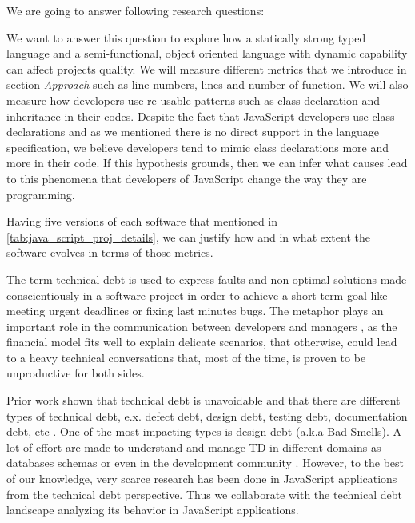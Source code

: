 
We are going to answer following research questions:

\noindent{\rqi}

We want to answer this question to explore how a statically strong typed language and a semi-functional, object oriented language with dynamic capability can affect projects quality. We will measure different metrics that we introduce in section \textit{Approach} such as line numbers, lines and number of function. We will also measure how developers use re-usable patterns such as class declaration and inheritance in their codes. Despite the fact that JavaScript developers use class declarations and as we mentioned there is no direct support in the language specification, we believe developers tend to mimic class declarations more and more in their code. If this hypothesis grounds, then we can infer what causes lead to this phenomena that developers of JavaScript change the way they are programming.
\par
{}
Having five versions of each software that mentioned in \ref{tab:java_script_proj_details}, we can justify how and in what extent the software evolves in terms of those metrics. 

\noindent{\rqii}

		 
The term technical debt is used to express faults and non-optimal solutions made conscientiously in a software project in order to achieve a short-term goal like meeting urgent deadlines or fixing last minutes bugs. The metaphor plays an important role in the communication between developers and managers \cite{kruchten2013MTD}, as the financial model fits well to explain delicate scenarios, that otherwise, could lead to a heavy technical conversations that, most of the time, is proven to be unproductive for both sides.  
		 
Prior work shown that technical debt is unavoidable \cite{zazworka2013MTD} and that there are different types of technical debt, e.x. defect debt, design debt, testing debt, documentation debt, etc \cite{Seaman2011MMTD} . One of the most impacting types is design debt \cite{zazworka2011MTD}\cite{Fontana2012MTD} (a.k.a Bad Smells). A lot of effort are made to understand and manage TD in different domains as databases schemas \cite{Weber2014MTD} or even in the development community \cite{Tamburri2013CHASE}. However, to the best of our knowledge, very scarce research has been done in JavaScript applications from the technical debt perspective. Thus we collaborate with the technical debt landscape analyzing its behavior in JavaScript applications. 

